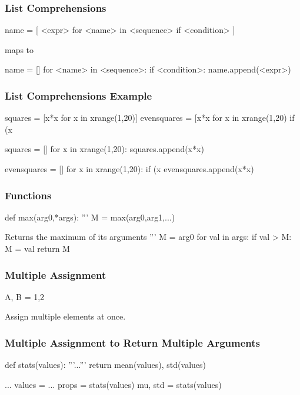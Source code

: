 \begin{frame}[fragile]
\frametitle{List Comprehensions}

\begin{python}
name = [ <expr> for <name> in <sequence> if <condition> ]
\end{python}

maps to

\begin{python}
name = []
for <name> in <sequence>:
    if <condition>:
        name.append(<expr>)
\end{python}

\end{frame}

\begin{frame}[fragile]
\frametitle{List Comprehensions Example}

\begin{python}
squares = [x*x for x in xrange(1,20)]
evensquares = [x*x for x in xrange(1,20) if (x%
\end{python}

\begin{python}
squares = []
for x in xrange(1,20):
    squares.append(x*x)

evensquares = []
for x in xrange(1,20):
    if (x%
        evensquares.append(x*x)
\end{python}

\end{frame}

\begin{frame}[fragile]
\frametitle{Functions}

\begin{python}
def max(arg0,*args):
    '''
    M = max(arg0,arg1,...)

    Returns the maximum of its arguments
    '''
    M = arg0
    for val in args:
        if val > M:
            M = val
    return M
\end{python}

\end{frame}


\begin{frame}[fragile]
\frametitle{Multiple Assignment}

\begin{python}
A, B = 1,2
\end{python}

Assign multiple elements at once.
\end{frame}

\begin{frame}[fragile]
\frametitle{Multiple Assignment to Return Multiple Arguments}

\begin{python}
def stats(values):
    '''...'''
    return mean(values), std(values)

...
values = ...
props = stats(values)
mu, std = stats(values)
\end{python}

\end{frame}


